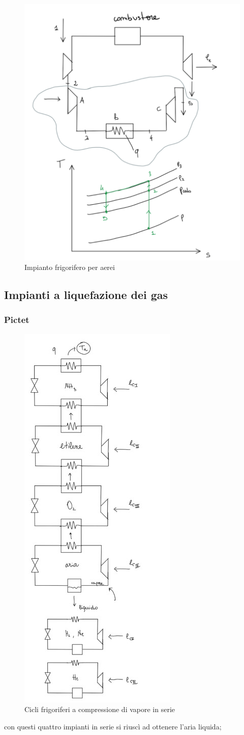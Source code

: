 \documentclass[a4paper]{article}
\numberwithin{equation}{section}%
\begin{document}
\begin{figure}[H]
	\begin{center}
		\includegraphics[width=0.4\columnwidth]{frigoaerei.png}
	\end{center}
	\caption{Impianto frigorifero per aerei}
\end{figure}

\subsection{Impianti a liquefazione dei gas}
\subsubsection{Pictet}
\begin{figure}[H]
	\begin{center}
		\includegraphics[width=0.4\columnwidth]{Pictet.jpg}
	\end{center}
	\caption{Cicli frigoriferi a compressione di vapore in serie}
\end{figure}
con questi quattro impianti in serie si riuscì ad ottenere l'aria liquida; 
\end{document}
